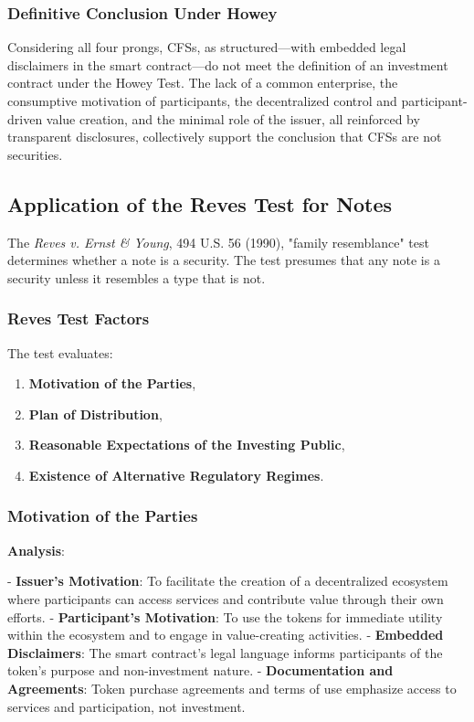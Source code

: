 \documentclass[a4paper,12pt]{article}
\begin{document}
\subsubsection{Definitive Conclusion Under Howey}
Considering all four prongs, CFSs, as structured—with embedded legal disclaimers in the smart contract—do not meet the definition of an investment contract under the Howey Test. The lack of a common enterprise, the consumptive motivation of participants, the decentralized control and participant-driven value creation, and the minimal role of the issuer, all reinforced by transparent disclosures, collectively support the conclusion that CFSs are not securities.

\subsection{Application of the Reves Test for Notes}
The \emph{Reves v. Ernst \& Young}, 494 U.S. 56 (1990), "family resemblance" test determines whether a note is a security. The test presumes that any note is a security unless it resembles a type that is not.

\subsubsection{Reves Test Factors}
The test evaluates:

\begin{enumerate}[label=\arabic*)]
 \item \textbf{Motivation of the Parties},
 \item \textbf{Plan of Distribution},
 \item \textbf{Reasonable Expectations of the Investing Public},
 \item \textbf{Existence of Alternative Regulatory Regimes}.
\end{enumerate}

\subsubsection{Motivation of the Parties}
\textbf{Analysis}:

- \textbf{Issuer's Motivation}: To facilitate the creation of a decentralized ecosystem where participants can access services and contribute value through their own efforts.
- \textbf{Participant's Motivation}: To use the tokens for immediate utility within the ecosystem and to engage in value-creating activities.
- \textbf{Embedded Disclaimers}: The smart contract's legal language informs participants of the token's purpose and non-investment nature.
- \textbf{Documentation and Agreements}: Token purchase agreements and terms of use emphasize access to services and participation, not investment.
\end{document}

